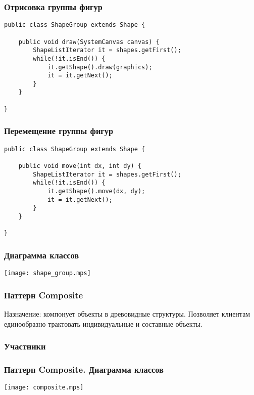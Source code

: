 \documentclass[handout]{beamer}
\begin{document}
\begin{frame}[fragile]
\frametitle{Отрисовка группы фигур}
\begin{lstlisting}
public class ShapeGroup extends Shape {

    public void draw(SystemCanvas canvas) {
        ShapeListIterator it = shapes.getFirst();
        while(!it.isEnd()) {
            it.getShape().draw(graphics);
            it = it.getNext();
        }
    }

}
\end{lstlisting}
\end{frame}


\begin{frame}[fragile]
\frametitle{Перемещение группы фигур}
\begin{lstlisting}
public class ShapeGroup extends Shape {

    public void move(int dx, int dy) {
        ShapeListIterator it = shapes.getFirst();
        while(!it.isEnd()) {
            it.getShape().move(dx, dy);
            it = it.getNext();
        }
    }

}
\end{lstlisting}
\end{frame}


\begin{frame}[fragile]
\frametitle{Диаграмма классов}
\begin{center}
\texttt{[image: shape\_group.mps]}
\end{center}
\end{frame}


\begin{frame}[fragile]
\frametitle{Паттерн Composite}
Назначение: компонует объекты в древовидные структуры. Позволяет клиентам
единообразно трактовать индивидуальные и составные объекты.
\end{frame}


\begin{frame}[fragile]
\frametitle{Участники}
\begin{itemize}
\end{itemize}
\end{frame}


\begin{frame}[fragile]
\frametitle{Паттерн Composite. Диаграмма классов}
\begin{center}
\texttt{[image: composite.mps]}
\end{center}
\end{frame}
\end{document}
